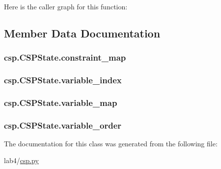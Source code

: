Here is the caller graph for this function\+:




\subsection{Member Data Documentation}
\hypertarget{classcsp_1_1_c_s_p_state_a121e387a978bd94e973fd75e5a34d7aa}{}
\subsubsection[{constraint\+\_\+map}]{\setlength{\rightskip}{0pt plus 5cm}csp.\+C\+S\+P\+State.\+constraint\+\_\+map}\label{classcsp_1_1_c_s_p_state_a121e387a978bd94e973fd75e5a34d7aa}
\hypertarget{classcsp_1_1_c_s_p_state_a13ed1ff27ef3d9c6e13f124be61fed74}{}
\subsubsection[{variable\+\_\+index}]{\setlength{\rightskip}{0pt plus 5cm}csp.\+C\+S\+P\+State.\+variable\+\_\+index}\label{classcsp_1_1_c_s_p_state_a13ed1ff27ef3d9c6e13f124be61fed74}
\hypertarget{classcsp_1_1_c_s_p_state_a6aea06dad446dc6c3f0f801211511929}{}
\subsubsection[{variable\+\_\+map}]{\setlength{\rightskip}{0pt plus 5cm}csp.\+C\+S\+P\+State.\+variable\+\_\+map}\label{classcsp_1_1_c_s_p_state_a6aea06dad446dc6c3f0f801211511929}
\hypertarget{classcsp_1_1_c_s_p_state_a43e4b250a7558b5f1429a25d15f4683f}{}
\subsubsection[{variable\+\_\+order}]{\setlength{\rightskip}{0pt plus 5cm}csp.\+C\+S\+P\+State.\+variable\+\_\+order}\label{classcsp_1_1_c_s_p_state_a43e4b250a7558b5f1429a25d15f4683f}


The documentation for this class was generated from the following file\+:\begin{DoxyCompactItemize}
\item 
lab4/\hyperlink{csp_8py}{csp.\+py}\end{DoxyCompactItemize}
